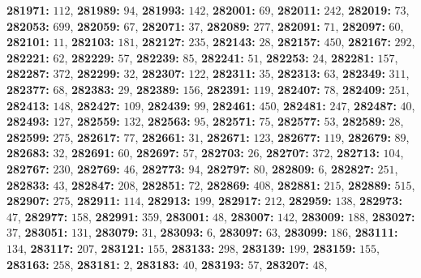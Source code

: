 \textsf{\bfseries 281971:} $112$, \textsf{\bfseries 281989:} $94$, \textsf{\bfseries 281993:} $142$, \textsf{\bfseries 282001:} $69$, \textsf{\bfseries 282011:} $242$, \textsf{\bfseries 282019:} $73$, \textsf{\bfseries 282053:} $699$, \textsf{\bfseries 282059:} $67$, \textsf{\bfseries 282071:} $37$, \textsf{\bfseries 282089:} $277$, \textsf{\bfseries 282091:} $71$, \textsf{\bfseries 282097:} $60$, \textsf{\bfseries 282101:} $11$, \textsf{\bfseries 282103:} $181$, \textsf{\bfseries 282127:} $235$, \textsf{\bfseries 282143:} $28$, \textsf{\bfseries 282157:} $450$, \textsf{\bfseries 282167:} $292$, \textsf{\bfseries 282221:} $62$, \textsf{\bfseries 282229:} $57$, \textsf{\bfseries 282239:} $85$, \textsf{\bfseries 282241:} $51$, \textsf{\bfseries 282253:} $24$, \textsf{\bfseries 282281:} $157$, \textsf{\bfseries 282287:} $372$, \textsf{\bfseries 282299:} $32$, \textsf{\bfseries 282307:} $122$, \textsf{\bfseries 282311:} $35$, \textsf{\bfseries 282313:} $63$, \textsf{\bfseries 282349:} $311$, \textsf{\bfseries 282377:} $68$, \textsf{\bfseries 282383:} $29$, \textsf{\bfseries 282389:} $156$, \textsf{\bfseries 282391:} $119$, \textsf{\bfseries 282407:} $78$, \textsf{\bfseries 282409:} $251$, \textsf{\bfseries 282413:} $148$, \textsf{\bfseries 282427:} $109$, \textsf{\bfseries 282439:} $99$, \textsf{\bfseries 282461:} $450$, \textsf{\bfseries 282481:} $247$, \textsf{\bfseries 282487:} $40$, \textsf{\bfseries 282493:} $127$, \textsf{\bfseries 282559:} $132$, \textsf{\bfseries 282563:} $95$, \textsf{\bfseries 282571:} $75$, \textsf{\bfseries 282577:} $53$, \textsf{\bfseries 282589:} $28$, \textsf{\bfseries 282599:} $275$, \textsf{\bfseries 282617:} $77$, \textsf{\bfseries 282661:} $31$, \textsf{\bfseries 282671:} $123$, \textsf{\bfseries 282677:} $119$, \textsf{\bfseries 282679:} $89$, \textsf{\bfseries 282683:} $32$, \textsf{\bfseries 282691:} $60$, \textsf{\bfseries 282697:} $57$, \textsf{\bfseries 282703:} $26$, \textsf{\bfseries 282707:} $372$, \textsf{\bfseries 282713:} $104$, \textsf{\bfseries 282767:} $230$, \textsf{\bfseries 282769:} $46$, \textsf{\bfseries 282773:} $94$, \textsf{\bfseries 282797:} $80$, \textsf{\bfseries 282809:} $6$, \textsf{\bfseries 282827:} $251$, \textsf{\bfseries 282833:} $43$, \textsf{\bfseries 282847:} $208$, \textsf{\bfseries 282851:} $72$, \textsf{\bfseries 282869:} $408$, \textsf{\bfseries 282881:} $215$, \textsf{\bfseries 282889:} $515$, \textsf{\bfseries 282907:} $275$, \textsf{\bfseries 282911:} $114$, \textsf{\bfseries 282913:} $199$, \textsf{\bfseries 282917:} $212$, \textsf{\bfseries 282959:} $138$, \textsf{\bfseries 282973:} $47$, \textsf{\bfseries 282977:} $158$, \textsf{\bfseries 282991:} $359$, \textsf{\bfseries 283001:} $48$, \textsf{\bfseries 283007:} $142$, \textsf{\bfseries 283009:} $188$, \textsf{\bfseries 283027:} $37$, \textsf{\bfseries 283051:} $131$, \textsf{\bfseries 283079:} $31$, \textsf{\bfseries 283093:} $6$, \textsf{\bfseries 283097:} $63$, \textsf{\bfseries 283099:} $186$, \textsf{\bfseries 283111:} $134$, \textsf{\bfseries 283117:} $207$, \textsf{\bfseries 283121:} $155$, \textsf{\bfseries 283133:} $298$, \textsf{\bfseries 283139:} $199$, \textsf{\bfseries 283159:} $155$, \textsf{\bfseries 283163:} $258$, \textsf{\bfseries 283181:} $2$, \textsf{\bfseries 283183:} $40$, \textsf{\bfseries 283193:} $57$, \textsf{\bfseries 283207:} $48$, 
